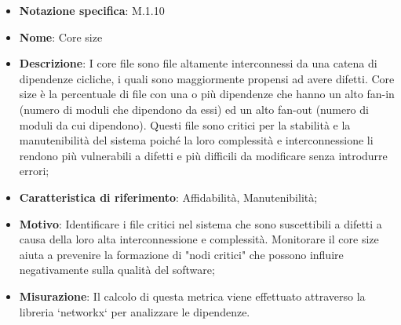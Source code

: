 \begin{itemize}
    \item \textbf{Notazione specifica}: M.1.10
    \item \textbf{Nome}: Core size
    \item \textbf{Descrizione}: I core file sono file altamente interconnessi da una catena di dipendenze cicliche, i quali sono maggiormente propensi ad avere difetti. Core size è la percentuale di file con una o più dipendenze che hanno un alto fan-in (numero di moduli che dipendono da essi) ed un alto fan-out (numero di moduli da cui dipendono). Questi file sono critici per la stabilità e la manutenibilità del sistema poiché la loro complessità e interconnessione li rendono più vulnerabili a difetti e più difficili da modificare senza introdurre errori;
    \item \textbf{Caratteristica di riferimento}: Affidabilità, Manutenibilità;
    \item \textbf{Motivo}: Identificare i file critici nel sistema che sono suscettibili a difetti a causa della loro alta interconnessione e complessità. Monitorare il core size aiuta a prevenire la formazione di "nodi critici" che possono influire negativamente sulla qualità del software;
    \item \textbf{Misurazione}: Il calcolo di questa metrica viene effettuato attraverso la libreria `networkx` per analizzare le dipendenze.
    
\end{itemize}
